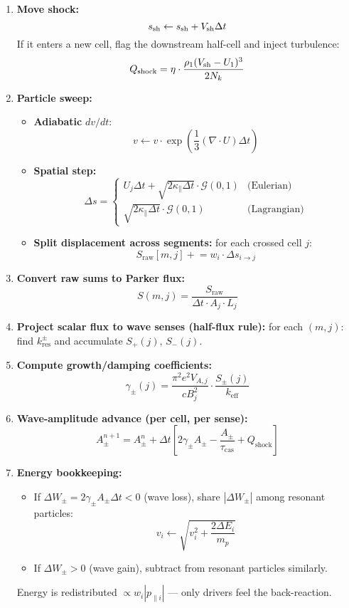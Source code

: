 \begin{enumerate}
    \item \textbf{Move shock:}
    \[
    s_{\rm sh} \leftarrow s_{\rm sh} + V_{\rm sh} \Delta t
    \]
    If it enters a new cell, flag the downstream half-cell and inject turbulence:
    \[
    Q_{\text{shock}} = \eta \cdot \frac{\rho_1 (V_{\rm sh} - U_1)^3}{2 N_k}
    \]
    
    \item \textbf{Particle sweep:}
    \begin{itemize}
        \item \textbf{Adiabatic } $dv/dt$: 
        \[
        v \leftarrow v \cdot \exp\left( \frac{1}{3} (\nabla \cdot U) \Delta t \right)
        \]
        \item \textbf{Spatial step:}
        \[
        \Delta s =
        \begin{cases}
        U_j \Delta t + \sqrt{2 \kappa_\parallel \Delta t}\cdot \mathcal{G}(0,1) & \text{(Eulerian)} \\
        \sqrt{2 \kappa_\parallel \Delta t} \cdot \mathcal{G}(0,1) & \text{(Lagrangian)}
        \end{cases}
        \]
        \item \textbf{Split displacement across segments:} for each crossed cell $j$:
        \[
        S_{\text{raw}}[m, j] \mathrel{+}= w_i \cdot \Delta s_{i \to j}
        \]
    \end{itemize}
    
    \item \textbf{Convert raw sums to Parker flux:}
    \[
    S(m,j) = \frac{S_{\text{raw}}}{\Delta t \cdot A_j \cdot L_j}
    \]
    
    \item \textbf{Project scalar flux to wave senses (half-flux rule):} for each $(m,j)$:
    find $k_{\text{res}}^{\pm}$ and accumulate $S_+(j)$, $S_-(j)$.
    
    \item \textbf{Compute growth/damping coefficients:}
    \[
    \gamma_\pm(j) = \frac{\pi^2 e^2 V_{A,j}}{c B_j^2} \cdot \frac{S_\pm(j)}{k_{\text{eff}}}
    \]
    
    \item \textbf{Wave-amplitude advance (per cell, per sense):}
    \[
    A_\pm^{n+1} = A_\pm^n + \Delta t \left[ 2 \gamma_\pm A_\pm - \frac{A_\pm}{\tau_{\text{cas}}} + Q_{\text{shock}} \right]
    \]
    
    \item \textbf{Energy bookkeeping:}
    \begin{itemize}
        \item If $\Delta W_\pm = 2 \gamma_\pm A_\pm \Delta t < 0$ (wave loss), share $|\Delta W_\pm|$ among resonant particles:
        \[
        v_i \leftarrow \sqrt{v_i^2 + \frac{2 \Delta E_i}{m_p}}
        \]
        \item If $\Delta W_\pm > 0$ (wave gain), subtract from resonant particles similarly.
    \end{itemize}
    Energy is redistributed $\propto w_i |p_{\parallel i}|$ — only drivers feel the back-reaction.
    

\end{enumerate}
